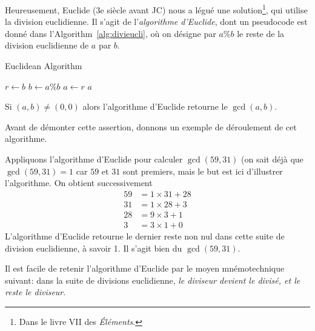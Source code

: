 \documentclass[french,course,oneside,theoremnosection]{lecture}
\begin{document}
Heureusement, Euclide (3e siècle avant JC) nous a légué une solution\footnote{Dans le livre VII des \emph{Éléments}.}, qui utilise la division euclidienne. Il s'agit de l'\emph{algorithme d'Euclide}, dont un pseudocode est donné dans l'Algorithm~\ref{alg:divieucli}, où on désigne par $a\%b$ le reste de la division euclidienne de $a$ par $b$.

\begin{algorithm}
\caption{Euclidean Algorithm}\label{alg:divieucli}
\begin{algorithmic}[1]
		
        \State $r \gets b$
        \State $b \gets a \% b$ 
        \State $a \gets r$ 		
    \EndWhile
    \State \Return $a$				
\EndFunction
\end{algorithmic}
\end{algorithm}

\begin{proposition}\label{prop:algoeucl}
Si $(a,b)\neq (0,0)$ alors l'algorithme d'Euclide retourne le $\gcd(a,b)$.
\end{proposition}
Avant de démonter cette assertion, donnons un exemple de déroulement de cet algorithme.

\begin{example}\label{ex:euc}
Appliquons l'algorithme d'Euclide pour calculer $\gcd(59, 31)$ (on sait déjà que $\gcd(59, 31)=1$ car $59$ et $31$ sont premiers, mais le but est ici d'illustrer l'algorithme. On obtient successivement
{\setlength{\jot}{2pt}
\begin{align}
59 & = 1\times 31 + 28 \label{df:01}\\
31 & = 1\times 28 + 3\label{df:02}\\
28 & = 9\times 3 +1 \label{df:03}\\
3 & = 3\times 1 + 0
\end{align}} 
L'algorithme d'Euclide retourne le dernier reste non nul dans cette suite de division euclidienne, à savoir 1. Il s'agit bien du  $\gcd(59,31)$. 
\end{example}
\begin{remark}
Il est facile de retenir l'algorithme d'Euclide par le moyen mnémotechnique suivant: dans la suite de divisions euclidienne, \emph{le diviseur devient le divisé, et le reste le diviseur}.
\end{remark}
\end{document}
